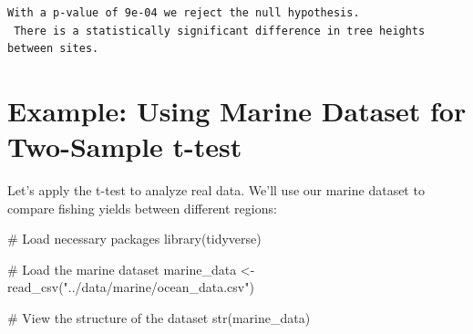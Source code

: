\documentclass[
  letterpaper,
]{book}
\newenvironment{Shaded}{\begin{snugshade}}{\end{snugshade}}
\newcommand{\CommentTok}[1]{\textcolor[rgb]{0.37,0.37,0.37}{#1}}
\newcommand{\ControlFlowTok}[1]{\textcolor[rgb]{0.00,0.23,0.31}{\textbf{#1}}}
\newcommand{\DecValTok}[1]{\textcolor[rgb]{0.68,0.00,0.00}{#1}}
\newcommand{\FloatTok}[1]{\textcolor[rgb]{0.68,0.00,0.00}{#1}}
\newcommand{\FunctionTok}[1]{\textcolor[rgb]{0.28,0.35,0.67}{#1}}
\newcommand{\NormalTok}[1]{\textcolor[rgb]{0.00,0.23,0.31}{#1}}
\newcommand{\OtherTok}[1]{\textcolor[rgb]{0.00,0.23,0.31}{#1}}
\newcommand{\SpecialCharTok}[1]{\textcolor[rgb]{0.37,0.37,0.37}{#1}}
\newcommand{\StringTok}[1]{\textcolor[rgb]{0.13,0.47,0.30}{#1}}
\begin{document}
\begin{Shaded}
\end{Shaded}

\begin{verbatim}
With a p-value of 9e-04 we reject the null hypothesis.
 There is a statistically significant difference in tree heights between sites.
\end{verbatim}

\section{Example: Using Marine Dataset for Two-Sample
t-test}\label{example-using-marine-dataset-for-two-sample-t-test}

Let's apply the t-test to analyze real data. We'll use our marine
dataset to compare fishing yields between different regions:

\begin{Shaded}
\begin{Highlighting}[]
\CommentTok{\# Load necessary packages}
\FunctionTok{library}\NormalTok{(tidyverse)}

\CommentTok{\# Load the marine dataset}
\NormalTok{marine\_data }\OtherTok{\textless{}{-}} \FunctionTok{read\_csv}\NormalTok{(}\StringTok{"../data/marine/ocean\_data.csv"}\NormalTok{)}

\CommentTok{\# View the structure of the dataset}
\FunctionTok{str}\NormalTok{(marine\_data)}
\end{Highlighting}
\end{Shaded}
\end{document}
